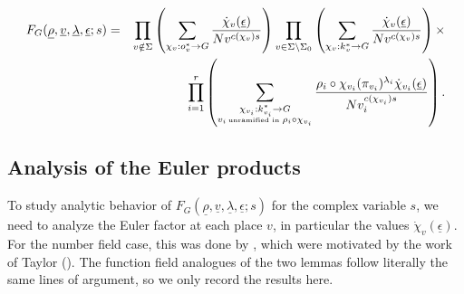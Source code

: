 \documentclass[12pt]{amsart}
\theoremstyle{plain}
\begin{document}
\begin{eqnarray*} F_G({\underline{{\rho}}},{\underline{{v}}},{\underline{{\lambda}}},{\underline{{\epsilon}}};s)&=&
\prod_{v \notin \Sigma }\left(\sum_{\chi_v:o_v^* \to G} \frac{\dot{\chi}_v({\underline{{\epsilon}}})}{Nv^{c(\chi_v)s}}\right) \prod_{v \in \Sigma \setminus \Sigma_0}\left(\sum_{\chi_v:k_v^* \to G} \frac{\dot{\chi}_v({\underline{{\epsilon}}})}{Nv^{c(\chi_v)s}}\right) \times \\
&& \prod_{i=1 }^r\left(\sum_{\substack{\chi_{v_i}:k_{v_i}^* \to G\\
v_i \, \mbox{\tiny unramified in } \rho_i \circ \chi_{v_i}}} \frac{\rho_i \circ \chi_{v_i}(\pi_{v_i})^{\lambda_i} \dot{\chi}_{v_i}({\underline{{\epsilon}}})}{Nv_i^{c(\chi_{v_i})s}}
\right).\end{eqnarray*}

\subsection{Analysis of the Euler products}

To study analytic behavior of $F_G({\underline{{\rho}}},{\underline{{v}}},{\underline{{\lambda}}},{\underline{{\epsilon}}};s)$ for the complex variable $s$, we need to analyze the Euler factor at each place $v$, in particular the values $\dot{\chi}_v({\underline{{\epsilon}}})$. For the number field case, this was done by \cite[Lemmas 2.15 and 2.16]{woo}, which were motivated by the work of Taylor (\cite{tay}). The function field analogues of the two lemmas follow literally the same lines of argument, so we only record the results here.
\end{document}
